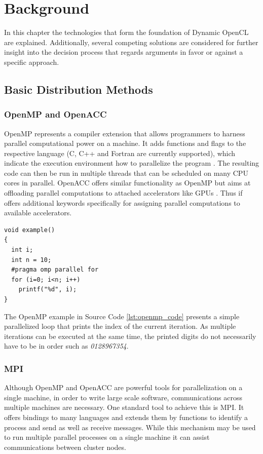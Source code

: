 \chapter{Background}
\label{background}
In this chapter the technologies that form the foundation of Dynamic OpenCL are explained. Additionally, several competing solutions are considered for further insight into the decision process that regards arguments in favor or against a specific approach.

\section{Basic Distribution Methods}
\label{distribution_basics}

\subsection*{OpenMP and OpenACC}
OpenMP represents a compiler extension that allows programmers to harness parallel computational power on a machine. It adds functions and flags to the respective language (C, C++ and Fortran are currently supported), which indicate the execution environment how to parallelize the program \cite{openmp_spec}. The resulting code can then be run in multiple threads that can be scheduled on many CPU cores in parallel. OpenACC offers similar functionality as OpenMP but aims at offloading parallel computations to attached accelerators like GPUs \cite{openacc_spec}. Thus if offers additional keywords specifically for assigning parallel computations to available accelerators.

\begin{lstlisting}[caption=OpenMP Code Example in C,captionpos=b,label=lst:openmp_code]
void example()
{
  int i;
  int n = 10;
  #pragma omp parallel for
  for (i=0; i<n; i++)
    printf("%d", i);
}
\end{lstlisting}

The OpenMP example in Source Code \ref{lst:openmp_code} presents a simple parallelized loop that prints the index of the current iteration. As multiple iterations can be executed at the same time, the printed digits do not necessarily have to be in order such as \textit{0128967354}. 

\subsection*{MPI}
Although OpenMP and OpenACC are powerful tools for parallelization on a single machine, in order to write large scale software, communications across multiple machines are necessary. One standard tool to achieve this is MPI.
It offers bindings to many languages and extends them by functions to identify a process and send as well as receive messages\cite{mpi_spec}. While this mechanism may be used to run multiple parallel processes on a single machine it can assist communications between cluster nodes.

